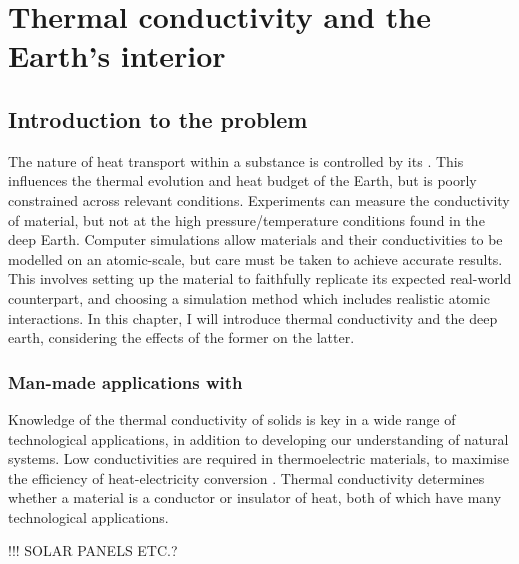 \chapter{Thermal conductivity and the Earth's interior} %

\label{Chapter1} %




\section{Introduction to the problem}

The nature of heat transport within a substance is controlled by its \tc. This influences the thermal evolution and heat budget of the Earth, but is poorly constrained across relevant conditions. Experiments can measure the conductivity of material, but not at the high pressure/temperature conditions found in the deep Earth. Computer simulations allow materials and their conductivities to be modelled on an atomic-scale, but care must be taken to achieve accurate results. This involves setting up the material to faithfully replicate its expected real-world counterpart, and choosing a simulation method which includes realistic atomic interactions. In this chapter, I will introduce thermal conductivity and the deep earth, considering the effects of the former on the latter.

\subsection{Man-made applications with \tc}
Knowledge of the thermal conductivity of solids is key in a wide range of technological applications, in addition to developing our understanding of natural systems. Low conductivities are required in thermoelectric materials, to maximise the efficiency of heat-electricity conversion \citep{Snyder2008}. Thermal conductivity determines whether a material is a conductor or insulator of heat, both of which have many technological applications.

!!! SOLAR PANELS ETC.?

